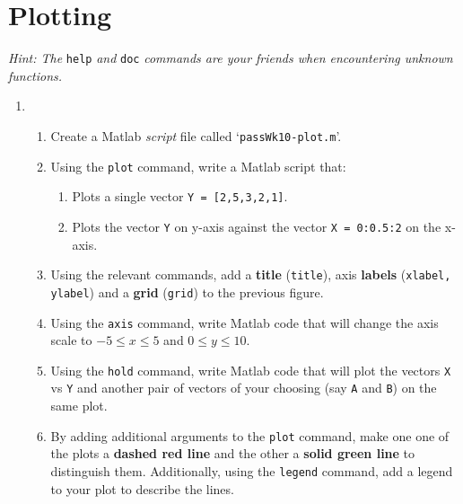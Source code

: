 \documentclass{pass}
\begin{document}
\section*{Plotting}
\textit{Hint: The} \texttt{help} \textit{and} \texttt{doc} \textit{commands are your friends when encountering unknown functions.}
\begin{enumerate}[resume]
	\item 
	\begin{enumerate}
		\item Create a Matlab \textit{script} file called `\texttt{passWk10-plot.m}'.\\
		
		\item Using the \texttt{plot} command, write a Matlab script that:
		\begin{enumerate}
			\item Plots a single vector \texttt{Y = [2,5,3,2,1]}.
			\item Plots the vector \texttt{Y} on y-axis against the vector \texttt{X = 0:0.5:2} on the x-axis.\\
		\end{enumerate}
		
		\item Using the relevant commands, add a \textbf{title} (\texttt{title}), axis \textbf{labels} (\texttt{xlabel, ylabel}) and a \textbf{grid} (\texttt{grid}) to the previous figure.\\
		
		\item Using the \texttt{axis} command, write Matlab code that will change the axis scale to $-5 \leq x \leq 5$ and $0 \leq y \leq 10$.\\
		
		\item Using the \texttt{hold} command, write Matlab code that will plot the vectors \texttt{X} vs \texttt{Y} and another pair of vectors of your choosing (say \texttt{A} and \texttt{B}) on the same plot.\\
		
		\item By adding additional arguments to the \texttt{plot} command, make one one of the plots a \textbf{dashed red line} and the other a \textbf{solid green line} to distinguish them. Additionally, using the \texttt{legend} command, add a legend to your plot to describe the lines.
	\end{enumerate}
\end{enumerate}
\end{document}
